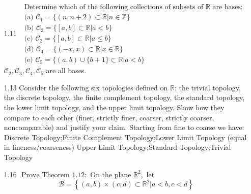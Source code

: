 \documentclass[12pt]{article}
\begin{document}
\begin{enumerate}
	\item[1.11]$ \begin{array} { l } { \text { Determine which of the following collections of subsets of } \mathbb { R } \text { are bases: } } \\ { \text { (a) } \mathcal { C } _ { 1 } = \{ ( n , n + 2 ) \subset \mathbb { R } | n \in \mathbb { Z } \} } \\ { \text { (b) } \mathcal { C } _ { 2 } = \{ [ a , b ] \subset \mathbb { R } | a < b \} } \\ { \text { (c) } \mathcal { C } _ { 3 } = \{ [ a , b ] \subset \mathbb { R } | a \leq b \} } \\ { \text { (d) } \mathcal { C } _ { 4 } = \{ ( - x , x ) \subset \mathbb { R } | x \in \mathbb { R } \} } \\ { \text { (e) } \mathcal { C } _ { 5 } = \{ ( a , b ) \cup \{ b + 1 \} \subset \mathbb { R } | a < b \} } \end{array} $\\
	$ \mathcal{C}_2,\mathcal{C}_3,\mathcal{C}_4,\mathcal{C}_5 $ are all bases.
	\item[1.13]Consider the following six topologies defined on $ \mathbb {R}$: the trivial topology, the discrete topology, the finite complement topology, the standard topology, the lower limit topology, and the upper limit topology. Show how they compare to each other (finer, strictly finer, coarser, strictly coarser, noncomparable) and justify your claim.
	Starting from fine to coarse we have:\\
	Discrete Topology;Finite Complement Topology;Lower Limit Topology (equal in fineness/coarseness) Upper Limit Topology;Standard Topology;Trivial Topology
	\item[1.16] $\text { Prove Theorem } 1.12 : \text { On the plane } \mathbb { R } ^ { 2 } , \text { let } $
		\[\mathcal { B } = \left\{ ( a , b ) \times ( c , d ) \subset \mathbb { R } ^ { 2 } | a < b , c < d \right\}\]
	

\end{enumerate}
\end{document}
